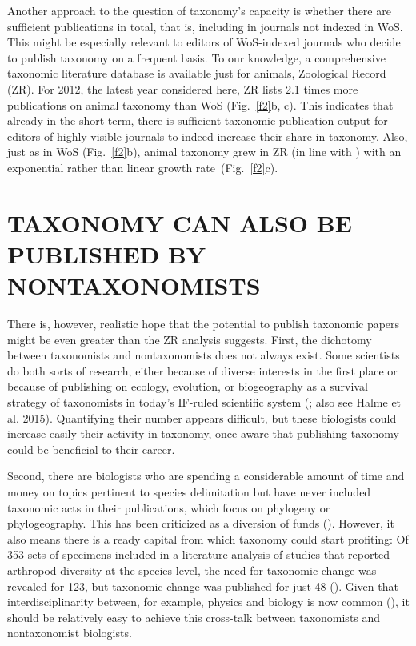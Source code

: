 \documentclass[webpdf,PV,mynatbib,surname,CE,MSC]{SYS-PV}
\begin{document}
Another approach to the question of taxonomy's capacity is whether there are sufficient
publications in total, that is, including in journals not indexed in WoS. This might be especially
relevant to editors of WoS-indexed journals who decide to publish taxonomy on a frequent basis. To
our knowledge, a comprehensive taxonomic literature database is available just for animals,
Zoological Record (ZR). For 2012, the latest year considered here, ZR lists 2.1 times more
publications on animal taxonomy than WoS (Fig.~\ref{f2}b, c). This indicates that already in the
short term, there is sufficient taxonomic publication output for editors of highly visible
journals to indeed increase their share in taxonomy. Also, just as in WoS (Fig.~\ref{f2}b), animal
taxonomy grew in ZR (in line with \citealt{49Tancoigne2013}) with an exponential rather than
linear growth rate~(Fig.~\ref{f2}c).


\section*{T{\sc AXONOMY} C{\sc AN} A{\sc LSO BE} P{\sc UBLISHED BY}
N{\sc ONTAXONOMISTS}}


There is, however, realistic hope that the potential to publish taxonomic papers might be even
greater than the ZR analysis suggests. First, the dichotomy between taxonomists and nontaxonomists
does not always exist. Some scientists do both sorts of research, either because of diverse
interests in the first place or because of publishing on ecology, evolution, or biogeography as a
survival strategy of taxonomists in today's IF-ruled scientific system (\citealt{40Samyn2012};
also see Halme et al. 2015). Quantifying their number appears difficult, but these biologists
could increase easily their activity in taxonomy, once aware that publishing taxonomy could be
beneficial to their career.

Second, there are biologists who are spending a considerable amount of time and money on topics
pertinent to species delimitation but have never included taxonomic acts in their publications,
which focus on phylogeny or phylogeography. This has been criticized as a diversion of funds
(\citealt{58Wheeler2004}). However, it also means there is a ready capital from which taxonomy
could start profiting: Of 353 sets of specimens included in a literature analysis of studies that
reported arthropod diversity at the species level, the need for taxonomic change was revealed for
123, but taxonomic change was published for just 48 (\citealt{42Schlick-Steiner2010}). Given that
interdisciplinarity between, for example, physics and biology is now common
(\citealt{56West2014}), it should be relatively easy to achieve this cross-talk between
taxonomists and nontaxonomist biologists.
\end{document}
